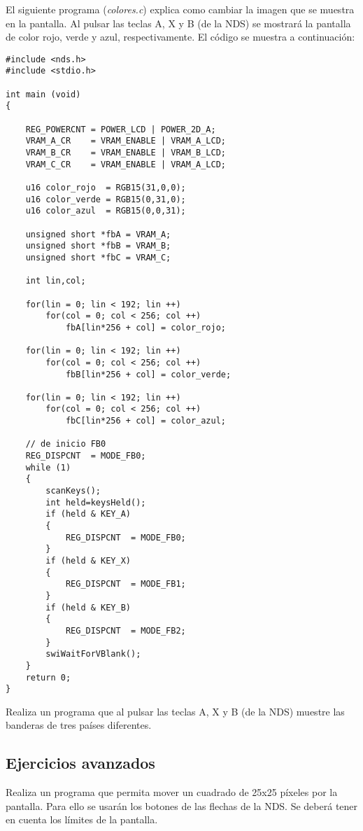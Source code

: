 \begin{example}
El siguiente programa (\textit{colores.c}) explica como cambiar la imagen que se muestra en la pantalla. Al pulsar las teclas A, X y B (de la NDS) se mostrará la pantalla de color rojo, verde y azul, respectivamente. El código se muestra a continuación:

\begin{lstlisting}	
#include <nds.h>
#include <stdio.h>

int main (void)
{
	
	REG_POWERCNT = POWER_LCD | POWER_2D_A;
	VRAM_A_CR    = VRAM_ENABLE | VRAM_A_LCD;
	VRAM_B_CR    = VRAM_ENABLE | VRAM_B_LCD;
	VRAM_C_CR    = VRAM_ENABLE | VRAM_A_LCD;
	
	u16 color_rojo  = RGB15(31,0,0);
	u16 color_verde = RGB15(0,31,0);
	u16 color_azul  = RGB15(0,0,31);
	
	unsigned short *fbA = VRAM_A;
	unsigned short *fbB = VRAM_B;
	unsigned short *fbC = VRAM_C;
	
	int lin,col;
	
	for(lin = 0; lin < 192; lin ++)
		for(col = 0; col < 256; col ++)
			fbA[lin*256 + col] = color_rojo;
	
	for(lin = 0; lin < 192; lin ++)
		for(col = 0; col < 256; col ++)
			fbB[lin*256 + col] = color_verde;
	
	for(lin = 0; lin < 192; lin ++)
		for(col = 0; col < 256; col ++)
			fbC[lin*256 + col] = color_azul;
	
	// de inicio FB0
	REG_DISPCNT  = MODE_FB0;
	while (1)
	{
		scanKeys();
		int held=keysHeld();
		if (held & KEY_A)
		{
			REG_DISPCNT  = MODE_FB0;
		}
		if (held & KEY_X)
		{
			REG_DISPCNT  = MODE_FB1;
		}
		if (held & KEY_B)
		{
			REG_DISPCNT  = MODE_FB2;
		}
		swiWaitForVBlank();
	}
	return 0;
}
\end{lstlisting}
\end{example}


\begin{exercise}
Realiza un programa que al pulsar las teclas A, X y B (de la NDS) muestre las banderas de tres países diferentes.
\end{exercise}


\subsection{Ejercicios avanzados}

\begin{exercise}
Realiza un programa que permita mover un cuadrado de 25x25 píxeles por la pantalla. Para ello se usarán los botones de las flechas de la NDS. Se deberá tener en cuenta los límites de la pantalla.
\end{exercise}






